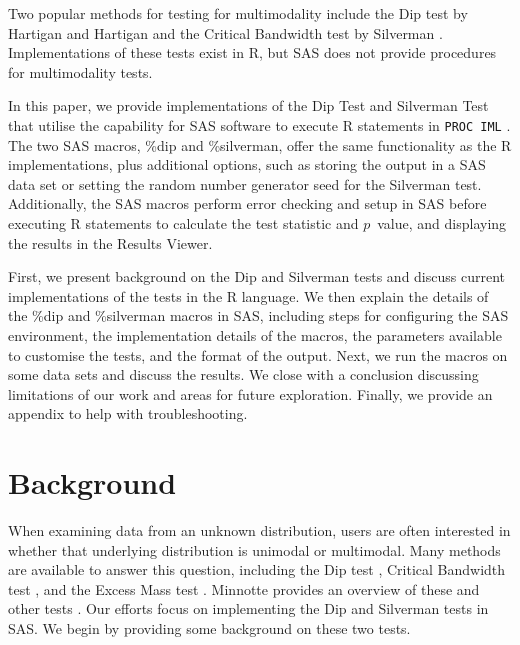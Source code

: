 \documentclass[]{interact}
\theoremstyle{plain}%
\theoremstyle{definition}
\theoremstyle{remark}
\begin{document}
Two popular methods for testing for multimodality include the Dip test by Hartigan and Hartigan \cite{hartigan1985dip} and the Critical Bandwidth test by Silverman \cite{silverman1981using}. Implementations of these tests exist in R, but SAS does not provide procedures for multimodality tests. 

In this paper, we provide implementations of the Dip Test and Silverman Test that utilise the capability for SAS software to execute R statements in \texttt{PROC IML} \citep{SAS-STAT}. %
The two SAS %
macros, \%dip and \%silverman, offer the same functionality as the R implementations, plus %
additional options, such as storing the output in a SAS data set or setting the random number generator seed for the Silverman test. Additionally, the SAS macros perform error checking and setup in SAS before executing R statements to calculate the test statistic and $p$~value, and displaying the results in the Results Viewer. 

First, we present background on the Dip and Silverman tests and discuss current implementations of the tests in the R language. We then explain the details of the \%dip and \%silverman macros in SAS, including steps for configuring the SAS environment, the implementation details of the macros, the parameters available to customise the tests, and the format of the output. Next, we run the macros on some data sets and discuss the results. We close with a conclusion %
discussing limitations of our work and areas for future exploration. Finally, we provide an appendix to help with troubleshooting.

\section{Background}\label{intro}
When examining data from an unknown distribution, users are often interested in whether that underlying distribution is unimodal or multimodal. Many methods are available to answer this question, including the Dip test \cite{hartigan1985dip}, Critical Bandwidth test \cite{silverman1981using}, and the Excess Mass test \cite{muller1991excess}. Minnotte provides an overview of these and other tests \cite{minnotte1993test}. Our efforts focus on implementing the Dip and Silverman tests in SAS. We begin by providing some background on these two tests.
\end{document}
